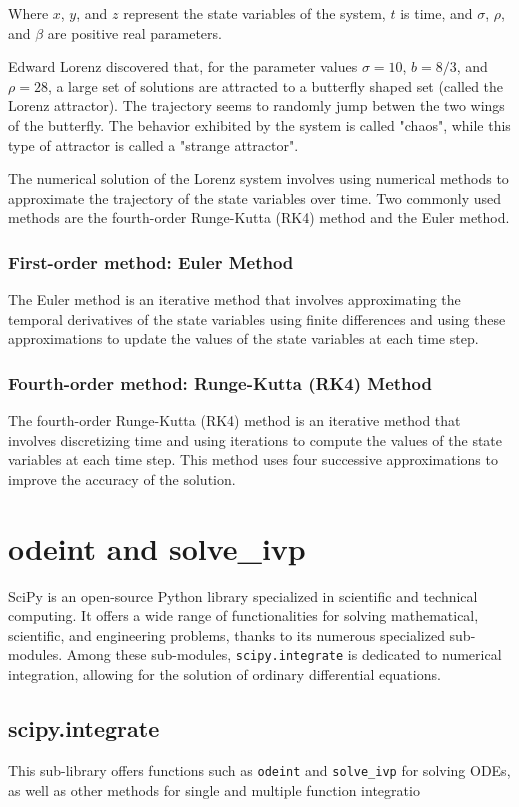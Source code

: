 \documentclass{article}
\begin{document}
Where $x$, $y$, and $z$ represent the state variables of the system, 
$t$ is time, and $\sigma$, $\rho$, and $\beta$ are positive real parameters.

Edward Lorenz discovered that, for the parameter values 
$\sigma = 10$, $b = 8/3$, and $\rho = 28$, a large set of solutions are attracted to a butterfly shaped set (called the Lorenz attractor). 
The trajectory seems to randomly jump betwen the two wings of the butterfly. 
The behavior exhibited by the system is called "chaos", while this type of attractor is called a "strange attractor". 

The numerical solution of the Lorenz system involves using numerical methods to approximate the trajectory of the state variables over time. 
Two commonly used methods are the fourth-order Runge-Kutta (RK4) method and the Euler method.

\subsubsection{First-order method: Euler Method}
The Euler method is an iterative method that involves approximating the temporal derivatives 
of the state variables using finite differences and using these approximations to update the values of the state variables at each time step. 

\subsubsection{Fourth-order method: Runge-Kutta (RK4) Method}
The fourth-order Runge-Kutta (RK4) method is an iterative method that involves discretizing 
time and using iterations to compute the values of the state variables at each time step. 
This method uses four successive approximations to improve the accuracy of the solution. 

\section{odeint and solve\_ivp}
SciPy is an open-source Python library specialized in scientific and technical computing. It offers a wide range of functionalities for solving mathematical, scientific, and engineering problems, thanks to its numerous specialized sub-modules. Among these sub-modules, \texttt{scipy.integrate} is dedicated to numerical integration, allowing for the solution of ordinary differential equations.
\subsection{scipy.integrate}
This sub-library offers functions such as \texttt{odeint} and \texttt{solve\_ivp} for solving ODEs, as well as other methods for single and multiple function integratio
\end{document}
